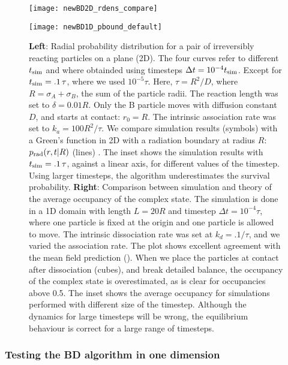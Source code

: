 \begin{figure}[ht]
\begin{minipage}[ht]{.5\linewidth}
\centering
\texttt{[image: newBD2D\_rdens\_compare]}
\end{minipage}
\begin{minipage}[ht]{.5\linewidth}
\centering
\texttt{[image: newBD1D\_pbound\_default]}
\end{minipage}
\caption{ {\bf Left}: Radial probability distribution for a pair of irreversibly reacting particles on a plane (2D). The four curves refer to different $t_{\rm sim}$ and where obtainded using timesteps  $\Delta t = 10^{-4} t_{\rm sim}$. Except for $t_{\rm sim} = .1\,\tau$, where we used $10^{-5} \tau$. Here, $\tau = R^2/D$, where $R=\sigma_A+\sigma_B$, the sum of the particle radii. The reaction length was set to $\delta=0.01 R$. Only the B particle moves with diffusion constant $D$, and starts at contact: $r_0=R$. The intrinsic association rate was set to $k_a = 100 R^2/\tau$. We compare simulation results (symbols) with a Green's function in 2D with a radiation boundary at radius $R$: $p_{\rm rad}(r,t|R)$ (lines) \cite{Beck1992}. The inset shows the simulation results with $t_{\rm sim} = .1\,\tau$, against a linear axis, for different values of the timestep. Using larger timesteps, the algorithm underestimates the survival probability.
{\bf Right}: Comparison between simulation and theory of the average occupancy of the complex state. The simulation is done in a 1D domain with length $L=20 R$ and timestep $\Delta t = 10^{-4} \tau$, where one particle is fixed at the origin and one particle is allowed to move. The intrinsic dissociation rate was set at $k_d=.1/\tau$, and we varied the association rate. The plot shows excellent agreement with the mean field prediction (). When we place the particles at contact after dissociation (cubes), and break detailed balance, the occupancy of the complex state is overestimated, as is clear for occupancies above 0.5. The inset shows the average occupancy for simulations performed with different size of the timestep. Although the dynamics for large timesteps will be wrong, the equilibrium behaviour is correct for a large range of timesteps.}
\end{figure}

\subsubsection{Testing the BD algorithm in one dimension}

